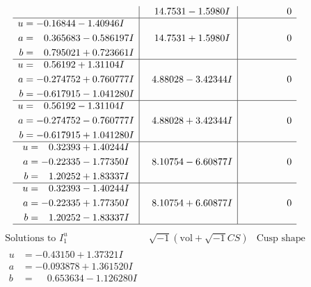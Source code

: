 \documentclass[1p]{elsarticle_modified}
\theoremstyle{definition}
\newcommand{\I}{\sqrt{-1}}
\begin{document}
$$\begin{array}{c|c|c}
 & \phantom{-}14.7531 - 1.5980 I & \phantom{-0.000000 } 0 \\ \hline\begin{aligned}
u &= -0.16844 - 1.40946 I \\
a &= \phantom{-}0.365683 - 0.586197 I \\
b &= \phantom{-}0.795021 + 0.723661 I\end{aligned}
 & \phantom{-}14.7531 + 1.5980 I & \phantom{-0.000000 } 0 \\ \hline\begin{aligned}
u &= \phantom{-}0.56192 + 1.31104 I \\
a &= -0.274752 + 0.760777 I \\
b &= -0.617915 - 1.041280 I\end{aligned}
 & \phantom{-}4.88028 - 3.42344 I & \phantom{-0.000000 } 0 \\ \hline\begin{aligned}
u &= \phantom{-}0.56192 - 1.31104 I \\
a &= -0.274752 - 0.760777 I \\
b &= -0.617915 + 1.041280 I\end{aligned}
 & \phantom{-}4.88028 + 3.42344 I & \phantom{-0.000000 } 0 \\ \hline\begin{aligned}
u &= \phantom{-}0.32393 + 1.40244 I \\
a &= -0.22335 - 1.77350 I \\
b &= \phantom{-}1.20252 + 1.83337 I\end{aligned}
 & \phantom{-}8.10754 - 6.60877 I & \phantom{-0.000000 } 0 \\ \hline\begin{aligned}
u &= \phantom{-}0.32393 - 1.40244 I \\
a &= -0.22335 + 1.77350 I \\
b &= \phantom{-}1.20252 - 1.83337 I\end{aligned}
 & \phantom{-}8.10754 + 6.60877 I & \phantom{-0.000000 } 0\\
 \hline 
 \end{array}$$\newpage$$\begin{array}{c|c|c}  
\text{Solutions to }I^u_{1}& \I (\text{vol} + \sqrt{-1}CS) & \text{Cusp shape}\\
 \hline 
\begin{aligned}
u &= -0.43150 + 1.37321 I \\
a &= -0.093878 + 1.361520 I \\
b &= \phantom{-}0.653634 - 1.126280 I\end{aligned}

\end{array}$$
\end{document}
